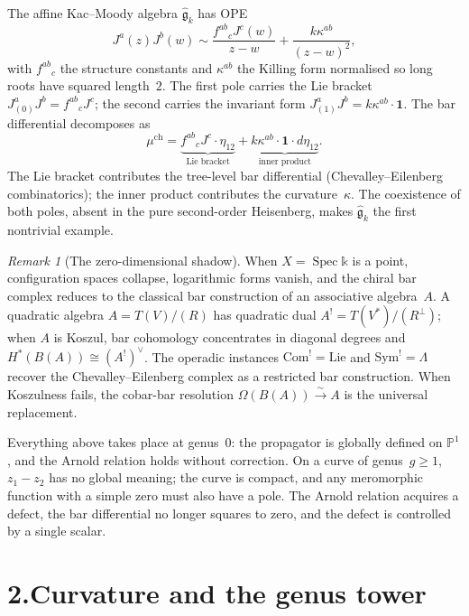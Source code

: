 \documentclass[11pt]{report}
\theoremstyle{definition}
\theoremstyle{remark}
\newtheorem{remark}[theorem]{Remark}
\providecommand{\Bbbk}{\mathbb{k}}
\numberwithin{equation}{section}
\begin{document}
The affine Kac--Moody algebra $\widehat{\mathfrak g}_k$ has OPE
\[
J^a(z)J^b(w)\sim\frac{f^{ab}{}_{c}J^c(w)}{z-w}+\frac{k\kappa^{ab}}{(z-w)^2},
\]
with $f^{ab}{}_c$ the structure constants and $\kappa^{ab}$ the Killing
form normalised so long roots have squared length~$2$. The first pole
carries the Lie bracket $J^a_{(0)}J^b=f^{ab}{}_cJ^c$; the second
carries the invariant form $J^a_{(1)}J^b=k\kappa^{ab}\cdot\mathbf 1$.
The bar differential decomposes as
\[
\mu^{\mathrm{ch}}=\underbrace{f^{ab}{}_c J^c\cdot\eta_{12}}_{\text{Lie bracket}}+\underbrace{k\kappa^{ab}\cdot\mathbf 1\cdot d\eta_{12}}_{\text{inner product}}.
\]
The Lie bracket contributes the tree-level bar differential
(Chevalley--Eilenberg combinatorics); the inner product contributes
the curvature~$\kappa$. The coexistence of both poles, absent in the
pure second-order Heisenberg, makes $\widehat{\mathfrak g}_k$ the
first nontrivial example.

\begin{remark}[The zero-dimensional shadow]\label{rem:preface-zero-dim}
When $X=\operatorname{Spec}\Bbbk$ is a point, configuration spaces
collapse, logarithmic forms vanish, and the chiral bar complex reduces
to the classical bar construction of an associative algebra~$A$. A
quadratic algebra $A=T(V)/(R)$ has quadratic dual
$A^!=T(V^*)/(R^\perp)$; when $A$ is Koszul, bar cohomology concentrates
in diagonal degrees and $H^*(B(A))\cong(A^!)^\vee$. The operadic
instances $\mathrm{Com}^!=\mathrm{Lie}$ and $\mathrm{Sym}^!=\Lambda$
recover the Chevalley--Eilenberg complex as a restricted bar
construction. When Koszulness fails, the cobar-bar resolution
$\Omega(B(A))\xrightarrow{\sim}A$ is the universal replacement.
\end{remark}

Everything above takes place at genus~$0$: the propagator is globally
defined on $\mathbb P^1$, and the Arnold relation holds without
correction. On a curve of genus~$g\ge 1$, $z_1-z_2$ has no global
meaning; the curve is compact, and any meromorphic function with a
simple zero must also have a pole. The Arnold relation acquires a
defect, the bar differential no longer squares to zero, and the
defect is controlled by a single scalar.


\section*{2.\quad Curvature and the genus tower}
\end{document}

